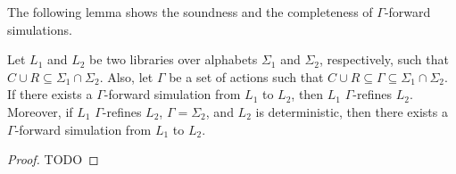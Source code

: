 The following lemma shows the soundness and the completeness of $\Gamma$-forward simulations.
\begin{theorem}\label{th:forSim}
Let $L_1$ and $L_2$ be two libraries over alphabets $\Sigma_1$ and $\Sigma_2$, respectively, such that $C\cup R \subseteq \Sigma_1\cap\Sigma_2$. Also, let $\Gamma$ be a set of actions such that $C\cup R\subseteq \Gamma\subseteq \Sigma_1\cap\Sigma_2$. If there exists a $\Gamma$-forward simulation from $L_1$ to $L_2$, then $L_1$ $\Gamma$-refines $L_2$. Moreover, if $L_1$ $\Gamma$-refines $L_2$, $\Gamma=\Sigma_2$, and $L_2$ is deterministic, then there exists a $\Gamma$-forward simulation from $L_1$ to $L_2$.
\end{theorem}
\begin{proof}
TODO
\end{proof}


